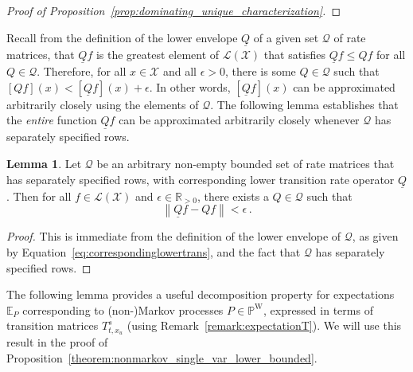 \documentclass[10pt,a4paper]{paper}
\theoremstyle{definition}
\newtheorem{lemma}[theorem]{Lemma}
\newcommand{\reals}{\mathbb{R}}
\newcommand{\realspos}{\reals_{>0}}
\newcommand{\states}{\mathcal{X}}
\newcommand{\processes}{\mathbb{P}}
\newcommand{\wprocesses}{\processes^{\mathrm{W}}}
\newcommand{\gambles}{\mathcal{L}}
\newcommand{\gamblesX}{\gambles(\states)}
\newcommand{\rateset}{\mathcal{Q}}
\newcommand{\lrate}{\underline{Q}}
\newcommand{\norm}[1]{\left\lVert #1 \right\rVert}
\begin{document}
\begin{proof}[Proof of Proposition~\ref{prop:dominating_unique_characterization}]
\end{proof}

Recall from the definition of the lower envelope $\lrate$ of a given set $\rateset$ of rate matrices, that $\lrate f$ is the greatest element of $\gamblesX$ that satisfies $\lrate f\leq Qf$ for all $Q\in\rateset$. Therefore, for all $x\in\states$ and all $\epsilon>0$, there is some $Q\in\rateset$ such that $[Qf](x)<[\lrate f](x)+\epsilon$. In other words, $[\lrate f](x)$ can be approximated arbitrarily closely using the elements of $\rateset$. The following lemma establishes that the \emph{entire} function $\lrate f$ can be approximated arbitrarily closely whenever $\rateset$ has separately specified rows.

\begin{lemma}\label{lemma:rateset_has_arginf}
Let $\rateset$ be an arbitrary non-empty bounded set of rate matrices that has separately specified rows, with corresponding lower transition rate operator $\lrate$. Then for all $f\in\gamblesX$ and $\epsilon\in\realspos$, there exists a $Q\in\rateset$ such that
\begin{equation*}
\norm{\lrate f - Qf} < \epsilon\,.
\end{equation*}
\end{lemma}
\begin{proof}
This is immediate from the definition of the lower envelope of $\rateset$, as given by Equation~\eqref{eq:correspondinglowertrans}, and the fact that $\rateset$ has separately specified rows.
\end{proof}

The following lemma provides a useful decomposition property for expectations $\mathbb{E}_P$ corresponding to (non-)Markov processes $P\in\wprocesses$, expressed in terms of transition matrices $T_{t,x_u}^s$ (using Remark~\ref{remark:expectationT}). We will use this result in the proof of Proposition~\ref{theorem:nonmarkov_single_var_lower_bounded}.
\end{document}
